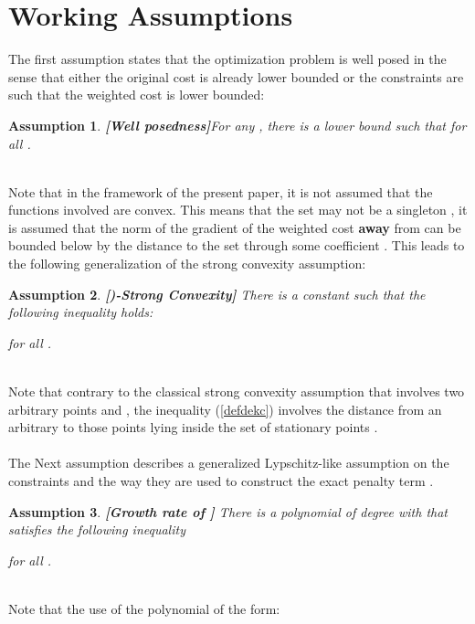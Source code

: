 \documentclass{article}
\newtheorem{assumption}{\bf Assumption}
\begin{document}
\section{Working Assumptions} \label{secworkingassumptions} 
\noindent The first assumption states that the optimization problem is well posed in the sense that either the original cost  is already lower bounded or the constraints are such that the weighted cost  is lower bounded:\\
\begin{assumption}{\bf [Well posedness]}\label{ass1} 
For any , there is a lower bound  such that  for all .
\end{assumption}
\ \\
Note that in the framework of the present paper, it is not assumed that the functions involved are convex. This means that the set  may not be a singleton , it is assumed that the norm of the gradient of the weighted cost  {\bf away} from  can be bounded below by the distance to the set  through some coefficient . This leads to the following generalization of the strong convexity assumption:\\
\begin{assumption}{\bf [)-Strong Convexity]} \label{ass2} 
There is a constant  such that the following inequality holds:
 
for all .
\end{assumption}
\ \\
Note that contrary to the classical strong convexity assumption that involves two arbitrary points  and , the inequality (\ref{defdekc}) involves the distance from an arbitrary  to those points lying inside the set of stationary points .\ \\ \ \\ 
The Next assumption describes a generalized Lypschitz-like assumption on the constraints and the way they are used to construct the exact penalty term . \\
\begin{assumption}{\bf [Growth rate of ]} \label{ass3}  There is a polynomial  of degree  with   that satisfies the  following inequality
 
for all . 
\end{assumption}
\ \\
Note that the use of the polynomial  of the form:
 
\end{document}
